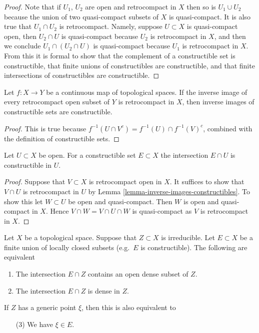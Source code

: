 \begin{proof}
Note that if $U_1$, $U_2$ are open and retrocompact in $X$
then so is $U_1 \cup U_2$ because the union of two quasi-compact
subsets of $X$ is quasi-compact. It is also true that
$U_1 \cap U_2$ is retrocompact. Namely, suppose $U \subset X$
is quasi-compact open, then $U_2 \cap U$ is quasi-compact because
$U_2$ is retrocompact in $X$, and then we conclude
$U_1 \cap (U_2 \cap U)$ is quasi-compact because $U_1$ is
retrocompact in $X$. From this it is formal to show that
the complement of a constructible set is constructible,
that finite unions of constructibles are constructible, and
that finite intersections of constructibles are constructible.
\end{proof}

\begin{lemma}
\label{lemma-inverse-images-constructibles}
Let $f : X \to Y$ be a continuous map of topological spaces.
If the inverse image of every retrocompact open subset of $Y$
is retrocompact in $X$, then inverse images of constructible
sets are constructible.
\end{lemma}

\begin{proof}
This is true because $f^{-1}(U \cap V^c) = f^{-1}(U) \cap f^{-1}(V)^c$,
combined with the definition of constructible sets.
\end{proof}

\begin{lemma}
\label{lemma-open-immersion-constructible-inverse-image}
Let $U \subset X$ be open. For a constructible set
$E \subset X$ the intersection $E \cap U$ is constructible
in $U$.
\end{lemma}

\begin{proof}
Suppose that $V \subset X$ is retrocompact open in $X$.
It suffices to show that $V \cap U$ is retrocompact in $U$
by Lemma \ref{lemma-inverse-images-constructibles}. To show this
let $W \subset U$ be open and quasi-compact. Then $W$
is open and quasi-compact in $X$. Hence $V \cap W = V \cap U \cap W$
is quasi-compact as $V$ is retrocompact in $X$.
\end{proof}

\begin{lemma}
\label{lemma-generic-point-in-constructible}
Let $X$ be a topological space. Suppose that
$Z \subset X$ is irreducible. Let $E \subset X$
be a finite union of locally closed subsets (e.g.\ $E$
is constructible). The following are equivalent
\begin{enumerate}
\item The intersection $E \cap Z$ contains an open
dense subset of $Z$.
\item The intersection $E \cap Z$ is dense in $Z$.
\end{enumerate}
If $Z$ has a generic point $\xi$, then this is
also equivalent to
\begin{enumerate}
\item[(3)] We have $\xi \in E$.
\end{enumerate}
\end{lemma}

